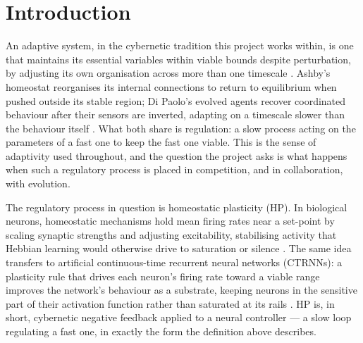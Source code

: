%
%

\section{Introduction}
\label{sec:intro}

An adaptive system, in the cybernetic tradition this project works within, is
one that maintains its essential variables within viable bounds despite
perturbation, by adjusting its own organisation across more than one timescale
\parencite{ashby1960}. Ashby's homeostat reorganises its internal connections
to return to equilibrium when pushed outside its stable region; Di Paolo's
evolved agents recover coordinated behaviour after their sensors are inverted,
adapting on a timescale slower than the behaviour itself
\parencite{dipaolo2000}. What both share is regulation: a slow process acting on
the parameters of a fast one to keep the fast one viable. This is the sense of
adaptivity used throughout, and the question the project asks is what happens
when such a regulatory process is placed in competition, and in collaboration,
with evolution.

The regulatory process in question is homeostatic plasticity (HP). In
biological neurons, homeostatic mechanisms hold mean firing rates near a
set-point by scaling synaptic strengths and adjusting excitability, stabilising
activity that Hebbian learning would otherwise drive to saturation or silence
\parencite{turrigiano1999}. The same idea transfers to artificial continuous-time
recurrent neural networks (CTRNNs): a plasticity rule that drives each neuron's
firing rate toward a viable range improves the network's behaviour as a
substrate, keeping neurons in the sensitive part of their activation function
rather than saturated at its rails \parencite{williamsnoble2007}. HP is, in
short, cybernetic negative feedback applied to a neural controller --- a slow
loop regulating a fast one, in exactly the form the definition above describes.

